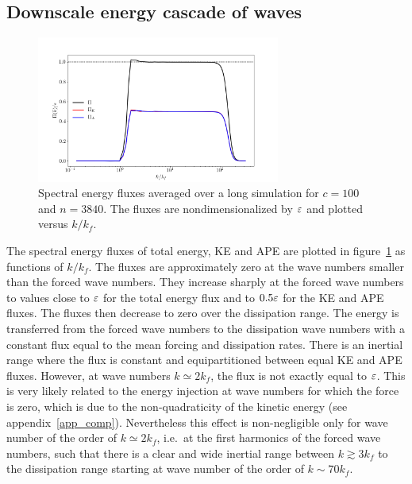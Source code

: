 

\subsection{Downscale energy cascade of waves}
\label{subsection_cascade}



\begin{figure}
\centerline{\includegraphics[width=8cm]{../Pyfig/fig_spect_energy_budg_c=100_N=3840}}
\caption{Spectral energy fluxes averaged over a long simulation for $c
= 100$ and $n = 3840$.  The fluxes are nondimensionalized by $\varepsilon$
and plotted versus $k/k_f$.  }
\label{fig_seb}
\end{figure}


The spectral energy fluxes of total energy, KE and APE are plotted in
figure~\ref{fig_seb} as functions of $k/k_f$.
%
The fluxes are approximately zero at the wave numbers smaller than the
forced wave numbers.  They increase sharply at the forced wave numbers
to values close to $\varepsilon$ for the total energy flux and to $0.5\varepsilon$
for the KE and APE fluxes.  The fluxes then decrease to zero over the
dissipation range.
%
The energy is transferred from the forced wave numbers to the
dissipation wave numbers with a constant flux equal to the mean
forcing and dissipation rates.
%
There is an inertial range where the flux is constant and
equipartitioned between equal KE and APE fluxes.
%
However, at wave numbers $k \simeq 2 k_f$, the flux is not exactly
equal to $\varepsilon$.  This is very likely related to the energy injection
at wave numbers for which the force is zero, which is due to the
non-quadraticity of the kinetic energy (see appendix~\ref{app_comp}).
%
Nevertheless this effect is non-negligible only for wave number of the
order of $k\simeq 2 k_f$, i.e.\ at the first harmonics of the forced
wave numbers, such that there is a clear and wide inertial range
between $k\gtrsim 3 k_f$ to the dissipation range starting at wave
number of the order of $k \sim 70 k_f$.





